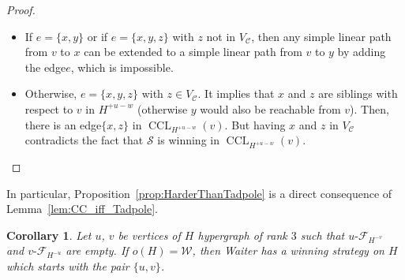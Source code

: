 \documentclass{article}
\newcommand{\strat}{\mathcal{S}}
\newcommand{\hedge}{edge\xspace}
\DeclareMathOperator{\CCL}{CCL}
\newcommand{\Client}{\mathcal{C}}
\newcommand{\Waiter}{\mathcal{W}}
\newcommand{\uCwin}{u\text{-}\mathcal{F}}
\newcommand{\vCwin}{v\text{-}\mathcal{F}}
\newtheorem{corollary}[theorem]{Corollary}
\begin{document}
\begin{proof}
	\begin{itemize}
	    \item If \(e=\{x,y\}\) or if \(e=\{x,y,z\}\) with \(z\) not in \(V_{\Client}\), then any simple linear path from \(v\) to \(x\) can be extended to a simple linear path from \(v\) to \(y\) by adding the \hedge \(e\), which is impossible.
	    \item Otherwise, \(e=\{x,y,z\}\) with \(z \in V_{\Client}\). It implies that \(x\) and \(z\) are siblings with respect to \(v\) in \(H^{+u-w}\) (otherwise \(y\) would also be reachable from \(v\)). 
	    Then, there is an \hedge \(\{x,z\}\) in  \(\CCL_{H^{+u-w}}(v)\). But having \(x\) and \(z\) in \(V_{\Client}\) contradicts the fact that \(\strat\) is winning in \(\CCL_{H^{+u-w}}(v)\). \qedhere
	\end{itemize}
\end{proof}

In particular, Proposition~\ref{prop:HarderThanTadpole} is a direct consequence of Lemma~\ref{lem:CC_iff_Tadpole}.

\begin{corollary}\label{cor:CC_iff_coupleTadpoles}
	Let \(u\), \(v\) be vertices of \(H\) hypergraph of rank \(3\) such that \(\uCwin_{H^{-v}}\) and \(\vCwin_{H^{-u}}\) are empty. If \(o(H)= \Waiter\), then Waiter has a winning strategy on \(H\) which starts with the pair \(\{u,v\}\). 
\end{corollary}
\end{document}

